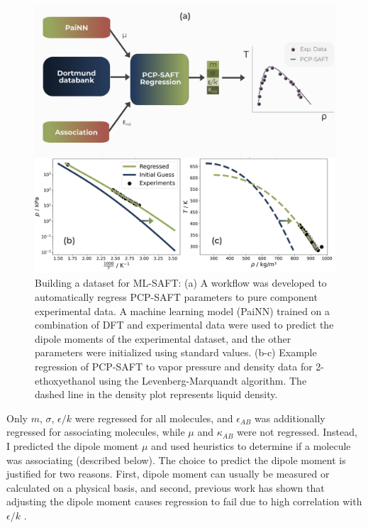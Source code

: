 \begin{figure}
    \centering
    \includegraphics[width=\textwidth]{gfx/Chapter08/deepsaft_regression.png}
    \caption{Building a dataset for ML-SAFT: (a) A workflow was developed to automatically regress PCP-SAFT parameters to pure component experimental data. A machine learning model (PaiNN) trained on  a combination of DFT and experimental data were used to predict the dipole moments of the experimental dataset, and the other parameters were initialized using standard values. (b-c) Example regression of PCP-SAFT to vapor pressure and density data for 2-ethoxyethanol using the Levenberg-Marquandt algorithm. The dashed line in the density plot represents liquid density.}
    \label{fig:ML-SAFT_regression}
\end{figure}

Only $m$, $\sigma$, $\epsilon/k$ were regressed for all molecules, and $\epsilon_{AB}$ was additionally regressed for associating molecules, while $\mu$ and $\kappa_{AB}$ were not regressed. Instead, I predicted the dipole moment $\mu$ and used heuristics to determine if a molecule was associating (described below). The choice to predict the dipole moment is justified for two reasons. First, dipole moment can usually be measured or calculated on a physical basis, and second, previous work has shown that adjusting the dipole moment causes regression to fail due to high correlation with $\epsilon/k$ \cite{Cripwell2017, deVilliers2011}. 

